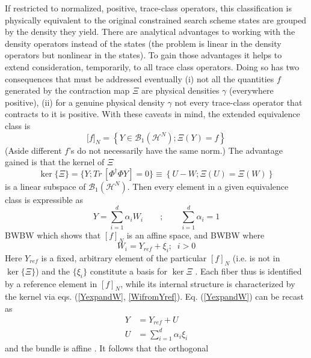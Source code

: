 \documentclass[aps,preprint]{revtex4}%
\begin{document}
If restricted to normalized, positive, trace-class operators, this
classification is physically equivalent to the original constrained search
scheme states are grouped by the density they yield. There are analytical
advantages to working with the density operators instead of the states (the
problem is linear in the density operators but nonlinear in the states). To
gain those advantages it helps to extend consideration, temporarily, to all
trace class operators. Doing so has two consequences that must be addressed
eventually (i) not all the quantities $f$ generated by the contraction map
$\Xi$ are physical densities $\gamma$ (everywhere positive), (ii) for a
genuine physical density $\gamma$ not every trace-class operator that
contracts to it is positive. With these caveats in mind, the extended
equivalence class is
\begin{equation}
\lbrack f]_{N}=\left\{  Y\in\mathcal{B}_{1}(\mathcal{H}^{N});\Xi(Y)=f\right\}
\label{genequiv}%
\end{equation}
(Aside different $f$'s do not necessarily have the same norm.) The advantage
gained is that the kernel of $\Xi$
\begin{equation}
\ker\{\Xi\}=\{Y;Tr\,[\Phi^{\dagger}\Phi Y]=0\}\equiv\left\{  U-W;\Xi\left(
U\right)  =\Xi\left(  W\right)  \right\}  \label{kerdef}%
\end{equation}
is a linear subspace of $\mathcal{B}_{1}(\mathcal{H}^{N})$. Then every element
in a given equivalence class is expressible as
\begin{equation}
Y=\sum_{i=1}^{d}\alpha_{i}W_{i}\qquad;\qquad\sum_{i=1}^{d}\alpha_{i}=1
\label{YexpandW}%
\end{equation}
BWBW which shows that $[f]_{N}$ is an affine space, and BWBW where
\begin{equation}
W_{i}=Y_{ref}+\xi_{i};\;\;i>0 \label{WifromYref}%
\end{equation}
Here $Y_{ref}$ is a fixed, arbitrary element of the particular $[f]_{N}$ (i.e.
is not in $\ker\{\Xi\}$) and the $\{\xi_{i}\}$ constitute a basis for $\ker
\Xi$ \cite{Yref}. Each fiber thus is identified by a reference element in
$[f]_{N}$, while its internal structure is characterized by the kernel via
eqs. (\ref{YexpandW}, \ref{WifromYref}). Eq. (\ref{YexpandW}) can be recast
as
\begin{align}
Y  &  =Y_{ref}+U\nonumber\\
U  &  =\sum_{i=1}^{d}\alpha_{i}\xi_{i} \label{YYref}%
\end{align}
and the bundle is affine \cite{diffbundle}. It follows that the orthogonal
\end{document}

